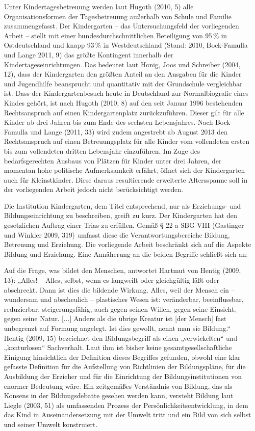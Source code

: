 Unter Kindertagesbetreuung werden laut Hugoth (2010, 5) alle Organisationsformen der Tagesbetreuung außerhalb von Schule und Familie zusammengefasst. Der Kindergarten -- das Untersuchungsfeld der vorliegenden Arbeit -- stellt mit einer bundesdurchschnitt\-lichen Beteiligung von 95\,\% in Ostdeutschland und knapp 93\,\% in Westdeutschland (Stand: 2010, Bock-Famulla und Lange 2011, 9) das größte Kontingent innerhalb der Kindertageseinrichtungen. Das bedeutet laut Honig, Joos  und Schreiber (2004, 12), dass der Kindergarten den größten Anteil an den Ausgaben für die Kinder und Jugendhilfe beansprucht und quantitativ mit der Grundschule vergleichbar ist. Dass der Kindergartenbesuch heute in Deutschland zur Normalbiografie eines Kindes gehört, ist nach Hugoth (2010, 8) auf den seit Januar 1996 bestehenden Rechtsanspruch auf einen Kindergartenplatz zurückzuführen. Dieser gilt für alle Kinder ab drei Jahren bis zum Ende des sechsten Lebensjahres. Nach Bock-Famulla und Lange (2011, 33) wird zudem angestrebt ab August 2013 den Rechtsanspruch auf einen Betreuungsplatz für alle Kinder vom vollendeten ersten bis zum vollendeten dritten Lebensjahr einzuführen. Im Zuge des bedarfsgerechten Ausbaus von Plätzen für Kinder unter drei Jahren, der momentan hohe politische Aufmerksamkeit erfährt, öffnet sich der Kindergarten auch für Kleinstkinder. Diese daraus resultierende erweiterte Altersspanne soll in der vorliegenden Arbeit jedoch nicht berücksichtigt werden.

Die Institution Kindergarten, dem Titel entsprechend, nur als Erziehungs- und Bildungseinrichtung zu beschreiben, greift zu kurz. Der Kindergarten hat den gesetzlichen Auftrag einer Trias zu erfüllen. Gemäß § 22 a SBG VIII (Gastinger und Winkler 2009, 319) umfasst diese die Verantwortungsbereiche Bildung, Betreuung und Erziehung. Die vorliegende Arbeit beschränkt sich auf die Aspekte Bildung und Erziehung. 
Eine Annäherung an die beiden Begriffe schließt sich an: 

Auf die Frage, was bildet den Menschen, antwortet Hartmut von Hentig (2009, 13): „Alles! -- Alles, selbst, wenn es langweilt oder gleichgültig läßt oder abschreckt. Dann ist dies die bildende Wirkung. Alles, weil der Mensch ein -- wundersam und abscheulich -- plastisches Wesen ist: veränderbar, be\-einflussbar, reduzierbar, steigerungsfähig, auch gegen seinen Willen, gegen seine Einsicht, gegen seine Natur. [...] Anders als die übrige Kreatur ist [der Mensch] fast unbegrenzt auf Formung angelegt. Ist dies gewollt, nennt man sie Bildung.“ 
Hentig (2009, 15) bezeichnet den Bildungsbegriff als einen „verwickelten“ und „konturlosen“ Sachverhalt. Laut ihm ist bisher keine gesamtgesellschaftliche Einigung hinsichtlich der Definition dieses Begriffes gefunden, obwohl eine klar gefasste Definition für die Aufstellung von Richtlinien der Bildungspläne, für die Ausbildung der Erzieher und für die Einrichtung der Bildungsinstitutionen von enormer Bedeutung wäre. 
Ein zeitgemäßes Verständnis von Bildung, das als Konsens in der Bildungsdebatte gesehen werden kann, versteht Bildung laut Liegle (2003, 51) als umfassenden Prozess der Persönlichkeitsentwicklung, in dem das Kind in Auseinandersetzung mit der Umwelt tritt und ein  Bild von sich selbst und seiner Umwelt konstruiert. 

